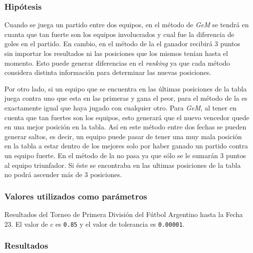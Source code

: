			\subsubsection*{Hipótesis} 
			Cuando se juega un partido entre dos equipos, en el método de \emph{GeM} se tendrá en cuanta que tan fuerte son los equipos involucrados y cual fue la diferencia de goles en el partido. En cambio, en el método de la  el ganador recibirá 3 puntos sin importar los resultados ni las posiciones que los mismos tenían hasta el momento. Esto puede generar diferencias en el \emph{ranking} ya que cada método considera distinta información para determinar las nuevas posiciones. 
			
			Por otro lado, si un equipo que se encuentra en las últimas posiciones de la tabla juega contra uno que esta en las primeras y gana el peor, para el método de la  es exactamente igual que haya jugado con cualquier otro. Para \emph{GeM}, al tener en cuenta que tan fuertes son los equipos, esto generará que el nuevo vencedor quede en una mejor posición en la tabla. Así en este método entre dos fechas se pueden generar saltos, es decir, un equipo puede pasar de tener una muy mala posición en la tabla a estar dentro de los mejores solo por haber ganado un partido contra un equipo fuerte. En el método de la  no pasa ya que sólo se le sumarán 3 puntos al equipo triunfador. Si éste se encontraba en las ultimas posiciones de la tabla no podrá ascender más de 3 posiciones. 		

			\subsubsection*{Valores utilizados como parámetros} 
				Resultados del Torneo de Primera División del Fútbol Argentino hasta la Fecha 23. El valor de $c$ es \texttt{0.85} y el valor de tolerancia es \texttt{0.00001}. 

			\subsubsection*{Resultados}

